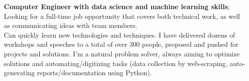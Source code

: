 \documentclass[10pt,a4paper,ragged2e]{altacv}
\begin{document}



\begin{fullwidth}
  \makecvheader

  \textbf{Computer Engineer with data science and machine learning skills}; Looking for a full-time job opportunity that covers both technical work, as well as communicating ideas with team members.\\

  Can quickly learn new technologies and techniques.
  I have delivered dozens of workshops and speeches to a total of over 300 people, proposed and pushed for projects and solutions.
  \smallskip
  I'm a natural problem solver, always aiming to optimize solutions and automating/digitizing tasks (data collection by web-scraping, auto-generating reports/documentation using Python).


\end{fullwidth}


\end{document}
